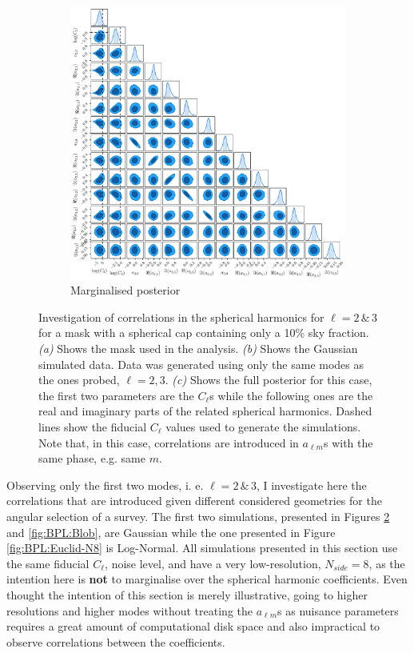 \begin{figure}
\begin{subfigure}[b]{\textwidth}
 \includegraphics[width=\textwidth]{BPL-FIGS/RandomBand_fsky_01_trianglePlot.pdf}
  \caption{Marginalised posterior}
  \label{fig:BPL:PoleTri}
\end{subfigure}
\caption[Investigation of correlation spherical harmonics for $\ell = 2\, \& \, 3$ for a mask with a spherical cap containing only a 10\% sky fraction]{Investigation of correlations in the spherical harmonics for $\ell = 2\, \& \, 3$ for a mask with a spherical cap containing only a 10\% sky fraction. \textit{(a)} Shows the mask used in the analysis. \textit{(b)} Shows the Gaussian simulated data. Data was generated using only the same modes as the ones probed, $\ell = 2,3$. \textit{(c)} Shows the full posterior for this case, the first two parameters are the $C_{\ell}$s while the following ones are the real and imaginary parts of the related spherical harmonics. Dashed lines show the fiducial $C_{\ell}$ values used to generate the simulations. Note that, in this case, correlations are introduced in $a_{\ell m}$s with the same phase, e.g. same $m$.}
\label{fig:BPL:Pole}
\end{figure}

\qquad Observing only the first two modes, i. e. $\ell = 2 \, \& \, 3$, I investigate here the correlations that are introduced given different considered geometries for the angular selection of a survey. The first two simulations, presented in Figures \ref{fig:BPL:Pole} and \ref{fig:BPL:Blob}, are Gaussian while the one presented in Figure \ref{fig:BPL:Euclid-N8} is Log-Normal. All simulations presented in this section use the same fiducial $C_{\ell}$, noise level, and have a very low-resolution, $N_{side}=8$, as the intention here is \textbf{not} to marginalise over the spherical harmonic coefficients. Even thought the intention of this section is merely illustrative, going to higher resolutions and higher modes without treating the $a_{\ell m}$s as nuisance parameters requires a great amount of computational disk space and also impractical to observe correlations between the coefficients. 

